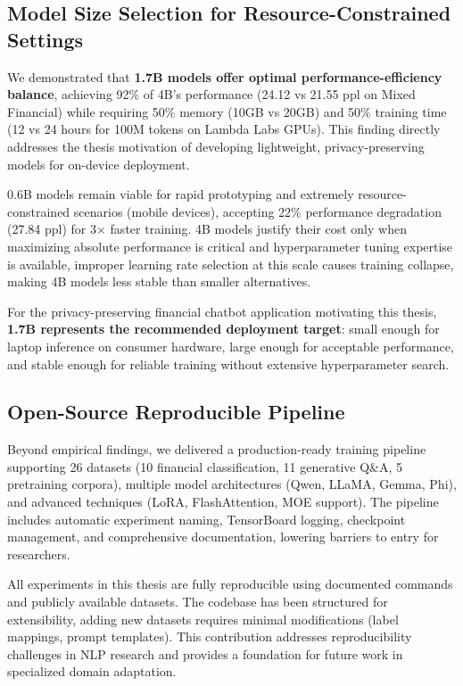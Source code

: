 \subsection{Model Size Selection for Resource-Constrained Settings}

We demonstrated that \textbf{1.7B models offer optimal performance-efficiency balance}, achieving 92\% of 4B's performance (24.12 vs 21.55 ppl on Mixed Financial) while requiring 50\% memory (10GB vs 20GB) and 50\% training time (12 vs 24 hours for 100M tokens on Lambda Labs GPUs). This finding directly addresses the thesis motivation of developing lightweight, privacy-preserving models for on-device deployment.

0.6B models remain viable for rapid prototyping and extremely resource-constrained scenarios (mobile devices), accepting 22\% performance degradation (27.84 ppl) for 3$\times$ faster training. 4B models justify their cost only when maximizing absolute performance is critical and hyperparameter tuning expertise is available, improper learning rate selection at this scale causes training collapse, making 4B models less stable than smaller alternatives.

For the privacy-preserving financial chatbot application motivating this thesis, \textbf{1.7B represents the recommended deployment target}: small enough for laptop inference on consumer hardware, large enough for acceptable performance, and stable enough for reliable training without extensive hyperparameter search.

\subsection{Open-Source Reproducible Pipeline}

Beyond empirical findings, we delivered a production-ready training pipeline supporting 26 datasets (10 financial classification, 11 generative Q\&A, 5 pretraining corpora), multiple model architectures (Qwen, LLaMA, Gemma, Phi), and advanced techniques (LoRA, FlashAttention, MOE support). The pipeline includes automatic experiment naming, TensorBoard logging, checkpoint management, and comprehensive documentation, lowering barriers to entry for researchers.

All experiments in this thesis are fully reproducible using documented commands and publicly available datasets. The codebase has been structured for extensibility, adding new datasets requires minimal modifications (label mappings, prompt templates). This contribution addresses reproducibility challenges in NLP research and provides a foundation for future work in specialized domain adaptation.

